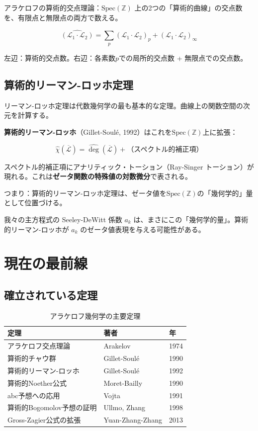 \documentclass[12pt,a4paper]{article}
\newcommand{\Spec}{\mathrm{Spec}}
\begin{document}
アラケロフの算術的交点理論：$\Spec(\mathbb{Z})$ 上の2つの「算術的曲線」の交点数を、有限点と無限点の両方で数える。

$$\widehat{(\mathcal{L}_1 \cdot \mathcal{L}_2)} = \sum_p (\mathcal{L}_1 \cdot \mathcal{L}_2)_p + (\mathcal{L}_1 \cdot \mathcal{L}_2)_\infty$$

左辺：算術的交点数。右辺：各素数$p$での局所的交点数 + 無限点での交点数。

\subsection{算術的リーマン-ロッホ定理}

リーマン-ロッホ定理は代数幾何学の最も基本的な定理。曲線上の関数空間の次元を計算する。

\textbf{算術的リーマン-ロッホ}（Gillet-Soulé, 1992）はこれを$\Spec(\mathbb{Z})$上に拡張：

$$\widehat{\chi}(\overline{\mathcal{L}}) = \widehat{\deg}(\overline{\mathcal{L}}) + \text{（スペクトル的補正項）}$$

\begin{deepbox}[我々の理論との接続]
スペクトル的補正項にアナリティック・トーション（Ray-Singer トーション）が現れる。これは\textbf{ゼータ関数の特殊値の対数微分}で表される。

つまり：算術的リーマン-ロッホ定理は、ゼータ値を$\Spec(\mathbb{Z})$の「幾何学的」量として位置づける。

我々の主方程式の Seeley-DeWitt 係数 $a_k$ は、まさにこの「幾何学的量」。算術的リーマン-ロッホが $a_k$ のゼータ値表現を与える可能性がある。
\end{deepbox}

\section{現在の最前線}

\subsection{確立されている定理}

\begin{table}[h]
\centering
\caption{アラケロフ幾何学の主要定理}
\small
\begin{tabular}{@{}lll@{}}
\toprule
定理 & 著者 & 年 \\
\midrule
アラケロフ交点理論 & Arakelov & 1974 \\
算術的チャウ群 & Gillet-Soulé & 1990 \\
算術的リーマン-ロッホ & Gillet-Soulé & 1992 \\
算術的Noether公式 & Moret-Bailly & 1990 \\
abc予想への応用 & Vojta & 1991 \\
算術的Bogomolov予想の証明 & Ullmo, Zhang & 1998 \\
Gross-Zagier公式の拡張 & Yuan-Zhang-Zhang & 2013 \\
\bottomrule
\end{tabular}
\end{table}
\end{document}
